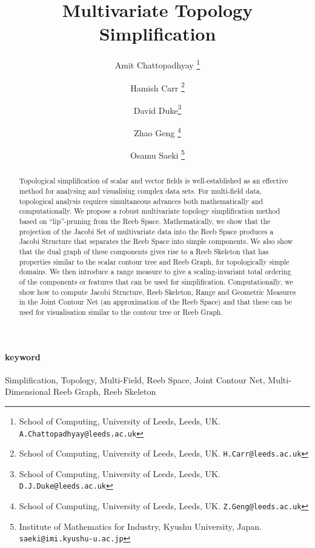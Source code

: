 \documentclass[twocolumn]{article}
\begin{document}
\title{\textbf{ Multivariate Topology Simplification}}



\author{Amit Chattopadhyay \thanks{ School of Computing, University of Leeds, 
  Leeds, UK. {\tt A.Chattopadhyay@leeds.ac.uk}}
\and
Hamish Carr \thanks{ School of Computing, University of Leeds, 
  Leeds, UK. {\tt H.Carr@leeds.ac.uk}}
\and
David Duke\thanks{ School of Computing, University of Leeds, 
  Leeds, UK. {\tt D.J.Duke@leeds.ac.uk}}
\and
Zhao Geng \thanks{ School of Computing, University of Leeds, 
  Leeds, UK. {\tt Z.Geng@leeds.ac.uk}}
\and
Osamu Saeki \thanks{Institute of Mathematics for Industry, Kyushu
  University, Japan. {\tt saeki@imi.kyushu-u.ac.jp}}
}


\maketitle

\begin{abstract}
Topological simplification of scalar and vector fields is well-established as 
an effective method for analysing and visualising complex data sets. For
multi-field data, topological analysis requires simultaneous advances
both mathematically and computationally. We propose a robust
multivariate topology simplification method based on ``lip''-pruning from the Reeb Space.
Mathematically, we show that the projection of the Jacobi Set of multivariate data into the Reeb Space produces
a Jacobi Structure that separates the Reeb Space into simple components.  We also show that the dual
graph of these components gives rise to a Reeb Skeleton that has properties similar
to the scalar contour tree and Reeb Graph, for topologically simple
domains.  We then introduce a range measure to give a scaling-invariant total
ordering of the components or features that can be used for simplification. Computationally, we show
how to compute Jacobi Structure, Reeb Skeleton, Range and Geometric Measures
in the Joint Contour Net (an approximation of the Reeb Space) and that these can be used for
visualisation similar to the contour tree or Reeb Graph.
\end{abstract}

\paragraph*{keyword}
Simplification, Topology, Multi-Field, Reeb Space, Joint Contour Net,
Multi-Dimensional Reeb Graph, Reeb Skeleton
\end{document}
